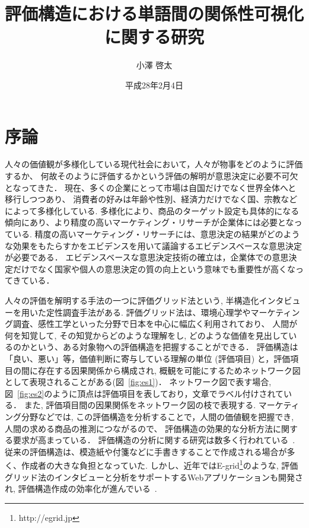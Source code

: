 \documentclass[syuuron]{kuee}
\title{評価構造における単語間の関係性可視化に関する研究}
\author{小澤 啓太}
\date{平成28年2月4日}
\begin{document}
\maketitle
\tableofcontents


\chapter{序論}
	人々の価値観が多様化している現代社会において，人々が物事をどのように評価するか、
	何故そのように評価するかという評価の解明が意思決定に必要不可欠となってきた．
	現在、多くの企業にとって市場は自国だけでなく世界全体へと移行しつつあり、
	消費者の好みは年齢や性別、経済力だけでなく国、宗教などによって多様化している. 
	多様化により、商品のターゲット設定も具体的になる傾向にあり、より精度の高いマーケティング・リサーチが企業体には必要となっている. 
	精度の高いマーケティング・リサーチには、意思決定の結果がどのような効果をもたらすかをエビデンスを用いて議論するエビデンスベースな意思決定が必要である．
	エビデンスベースな意思決定技術の確立は，企業体での意思決定だけでなく国家や個人の意思決定の質の向上という意味でも重要性が高くなってきている．
	
	人々の評価を解明する手法の一つに評価グリッド法という, 半構造化インタビューを用いた定性調査手法がある. 
	評価グリッド法は、環境心理学やマーケティング調査、感性工学といった分野で日本を中心に幅広く利用されており、
	人間が何を知覚して, その知覚からどのような理解をし, どのような価値を見出しているのかという、ある対象物への評価構造を把握することができる．
	評価構造は「良い、悪い」等，価値判断に寄与している理解の単位 (評価項目) と，評価項目の間に存在する因果関係から構成され, 
	概観を可能にするためネットワーク図として表現されることがある(図~\ref{fig:es1})．
	ネットワーク図で表す場合, 図~\ref{fig:es2}のように頂点は評価項目を表しており，文章でラベル付けされている．
	また, 評価項目間の因果関係をネットワーク図の枝で表現する. 
	マーケティング分野などでは, この評価構造を分析することで，人間の価値観を把握でき, 人間の求める商品の推測につながるので、
	評価構造の効果的な分析方法に関する要求が高まっている\cite{egm6, egm7}．
	評価構造の分析に関する研究は数多く行われている~\cite{egm8, egm9}. 
	従来の評価構造は、模造紙や付箋などに手書きすることで作成される場合が多く、作成者の大きな負担となっていた. 
	しかし、近年ではE-grid\footnote{http://egrid.jp}のような, 評価グリッド法のインタビューと分析をサポートするWebアプリケーションも開発され, 評価構造作成の効率化が進んでいる~\cite{egm5, egm6, egm10}. 
	
\end{document}
